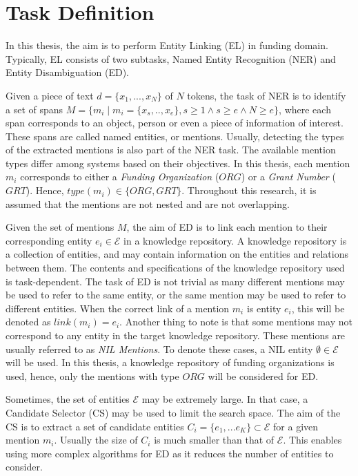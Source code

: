 \documentclass{report}
\theoremstyle{definition}
\theoremstyle{remark}
\begin{document}
\section{Task Definition}
In this thesis, the aim is to perform Entity Linking (EL) in funding domain. Typically, EL consists of two subtasks, Named Entity Recognition (NER) and Entity Disambiguation (ED).

Given a piece of text $d=\{x_1,...,x_N\}$ of $N$ tokens, the task of NER is to identify a set of spans $M = \{m_i \mid m_i = \{x_s,..,x_e\}, s \geq 1 \land s\geq e \land N \geq e\}$, where each span corresponds to an object, person or even a piece of information of interest. These spans are called named entities, or mentions. Usually, detecting the types of the extracted mentions is also part of the NER task. The available mention types differ among systems based on their objectives. In this thesis, each mention $m_i$ corresponds to either a \textit{Funding Organization} ($ORG$)  or a \textit{Grant Number} ($GRT$). Hence, $type(m_i) \in \{ORG,GRT\}$. Throughout this research, it is assumed that the mentions are not nested and are not overlapping.

Given the set of mentions $M$, the aim of ED is to link each mention to their corresponding entity $e_i \in \mathcal{E} $ in a knowledge repository. A knowledge repository is a collection of entities, and may contain information on the entities and relations between them. The contents and specifications of the knowledge repository used is task-dependent. The task of ED is not trivial as many different mentions may be used to refer to the same entity, or the same mention may be used to refer to different entities. When the correct link of a mention $m_i$ is entity $e_i$, this will be denoted as $link(m_i) = e_i $.  Another thing to note is that some mentions may not correspond to any entity in the target knowledge repository. These mentions are usually referred to as \textit{NIL Mentions}. To denote these cases, a NIL entity $\emptyset \in \mathcal{E}$ will be used. In this thesis, a knowledge repository of funding organizations is used, hence, only the mentions with type $ORG$ will be considered for ED.

Sometimes, the set of entities $\mathcal{E}$ may be extremely large. In that case, a Candidate Selector (CS) may be used to limit the search space. The aim of the CS is to extract a set of candidate entities $C_i = \{e_1,...e_K\} \subset \mathcal{E} $ for a given mention $m_i$. Usually the size of $C_i$ is much smaller than that of $\mathcal{E}$. This enables using more complex algorithms for ED as it reduces the number of entities to consider.
\end{document}
